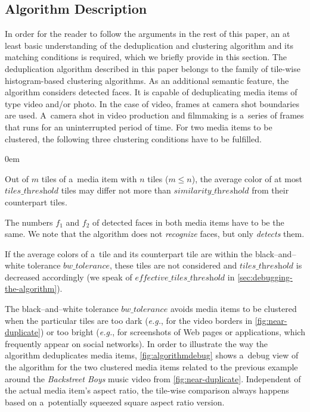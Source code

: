 \documentclass{article}
\begin{document}
\subsection{Algorithm Description}

In order for the reader to follow the arguments in the rest of this paper,
an at least basic understanding of the deduplication and clustering algorithm
and its matching conditions is required, which we briefly provide in this section.
The deduplication algorithm described in this paper
belongs to the family of tile-wise histogram-based clustering algorithms.
As an additional semantic feature, the algorithm considers detected faces.
It is capable of deduplicating media items of type video and/or photo.
In the case of video, frames at camera shot boundaries are used. %
A~camera shot in video production and filmmaking
is a~series of frames that runs for an uninterrupted period of time.
For two media items to be clustered,
the following three clustering conditions have to be fulfilled.

\begin{description}
  \itemsep0em 
  \item[Cond.~1] Out of $m$ tiles of a~media item with $n$ tiles ($m \leq n$),
    the average color of at most $\textit{tiles\_threshold}$ tiles may differ
    not more than $\textit{similarity\_threshold}$ from their counterpart tiles.
  \item[Cond.~2] The numbers $f_1$ and $f_2$ of detected faces in both media items
    have to be the same.
    We note that the algorithm does not \emph{recognize} faces,
    but only \emph{detects} them.
  \item[Cond.~3] If the average colors of a~tile and its counterpart tile
    are within the black--and--white tolerance $\textit{bw\_tolerance}$,
    these tiles are not considered and $\textit{tiles\_threshold}$
    is decreased accordingly (we speak of $\textit{effective\_tiles\_threshold}$
    in \autoref{sec:debugging-the-algorithm}).
\end{description}

The black--and--white tolerance $\textit{bw\_tolerance}$
avoids media items to be clustered when the particular tiles are too dark
(\emph{e.g.}, for the video borders in \autoref{fig:near-duplicate})
or too bright (\emph{e.g.}, for screenshots of Web pages or applications,
which frequently appear on social networks).
In order to illustrate the way the algorithm deduplicates media items,
\autoref{fig:algorithmdebug} shows a~debug view of the algorithm
for the two clustered media items related to the previous example around the
\emph{Backstreet Boys} music video from \autoref{fig:near-duplicate}.
Independent of the actual media item's aspect ratio,
the tile-wise comparison always happens based on a~potentially squeezed
square aspect ratio version.
\end{document}
